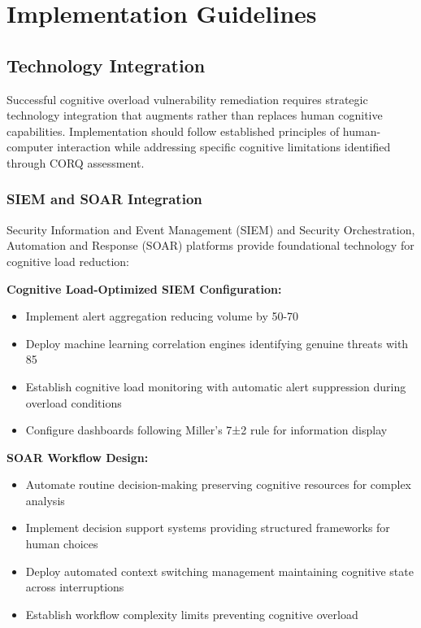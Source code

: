 \documentclass[11pt,a4paper]{article}
\begin{document}
\section{Implementation Guidelines}

\subsection{Technology Integration}

Successful cognitive overload vulnerability remediation requires strategic technology integration that augments rather than replaces human cognitive capabilities. Implementation should follow established principles of human-computer interaction while addressing specific cognitive limitations identified through CORQ assessment.

\subsubsection{SIEM and SOAR Integration}

Security Information and Event Management (SIEM) and Security Orchestration, Automation and Response (SOAR) platforms provide foundational technology for cognitive load reduction:

\textbf{Cognitive Load-Optimized SIEM Configuration:}
\begin{itemize}
\item Implement alert aggregation reducing volume by 50-70%
\item Deploy machine learning correlation engines identifying genuine threats with 85%
\item Establish cognitive load monitoring with automatic alert suppression during overload conditions
\item Configure dashboards following Miller's 7±2 rule for information display
\end{itemize}

\textbf{SOAR Workflow Design:}
\begin{itemize}
\item Automate routine decision-making preserving cognitive resources for complex analysis
\item Implement decision support systems providing structured frameworks for human choices
\item Deploy automated context switching management maintaining cognitive state across interruptions
\item Establish workflow complexity limits preventing cognitive overload
\end{itemize}
\end{document}
